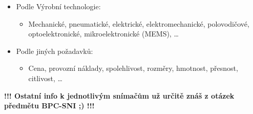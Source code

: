 \begin{itemize}
\begin{itemize}
  \end{itemize}
  \item Podle Výrobní technologie: \begin{itemize}
    \item Mechanické, pneumatické, elektrické, elektromechanické, polovodičové, optoelektronické, mikroelektronické (MEMS), \dots
  \end{itemize}
  \item Podle jiných požadavků: \begin{itemize}
    \item Cena, provozní náklady, spolehlivost, rozměry, hmotnost, přesnost, citlivost, \dots
  \end{itemize}
\end{itemize}

\textbf{!!! Ostatní info k jednotlivým snímačům už určitě znáš z otázek předmětu BPC-SNI ;) !!!
}
